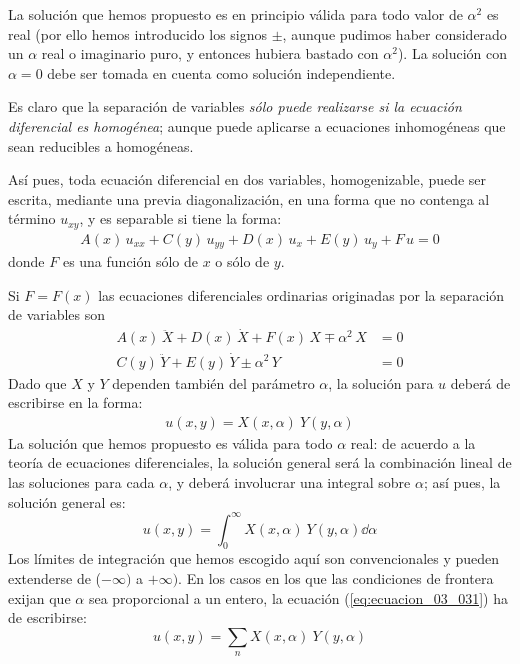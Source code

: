 \par
La solución que hemos propuesto es en principio válida para todo valor de $\alpha^{2}$ es real (por ello hemos introducido los signos $\pm$, aunque pudimos haber considerado un $\alpha$ real o imaginario puro, y entonces hubiera bastado con $\alpha^{2}$). La solución con $\alpha = 0$ debe ser tomada en cuenta como solución independiente.
\par
Es claro que la separación de variables \emph{sólo puede realizarse si la ecuación diferencial es homogénea}; aunque puede aplicarse a ecuaciones inhomogéneas que sean reducibles a homogéneas.
\par
Así pues, toda ecuación diferencial en dos variables, homogenizable, puede ser escrita, mediante una previa diagonalización, en una forma que no contenga al término $u_{xy}$, y es separable si tiene la forma:
\begin{align*}
A(x) \, u_{xx} + C(y) \, u_{yy} + D(x) \, u_{x} + E(y) \, u_{y} + F \, u = 0
\end{align*}
donde $F$ es una función sólo de $x$ o sólo de $y$.
\par
Si $F = F (x)$ las ecuaciones diferenciales ordinarias originadas por la separación de variables son
\begin{align*}
A(x) \, \ddot{X} +D(x) \, \dot{X} + F(x) \, X \mp \alpha^{2} \, X &= 0 \\
C(y) \, \ddot{Y} + E(y) \, \dot{Y} \pm \alpha^{2} \, Y &= 0
\end{align*}
Dado que $X$ y $Y$ dependen también del parámetro $\alpha$, la solución para $u$ deberá de escribirse en la forma:
\begin{align*}
u(x, y) = X(x, \alpha) \: Y (y, \alpha)
\end{align*}
La solución que hemos propuesto es válida para todo $\alpha$ real: de acuerdo a la teoría de ecuaciones diferenciales, la solución general será la combinación lineal de las soluciones para cada $\alpha$, y deberá involucrar una integral sobre $\alpha$; así pues, la solución general es:
\begin{equation}
u(x, y) = \int_{0}^{\infty} X(x, \alpha) \: Y(y, \alpha) \dd{\alpha}
\label{eq:ecuacion_03_031}
\end{equation}
Los límites de integración que hemos escogido aquí son convencionales y pueden extenderse de ($-\infty)$ a $+\infty)$. En los casos en los que las condiciones de frontera exijan que $\alpha$ sea proporcional a un entero, la ecuación (\ref{eq:ecuacion_03_031}) ha de escribirse:
\begin{equation}
u(x, y) = \sum_{n} X(x, \alpha) \: Y(y, \alpha)
\label{eq:ecuacion_03_032}
\end{equation}
